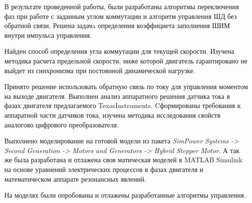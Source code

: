 \documentclass{article}
\begin{document}
В результате проведенной работы, были разработаны алгоритмы переключения фаз при
работе с заданным углом коммутации и алгоритм управления ШД без обратной связи.
Решена задачa определения коэффициета заполнения ШИМ внутри импульса
управления.

Найден способ определения угла коммутации для текущей скорости. Изучена методика
расчета предельной скорости, ниже которой двигатель гарантировано не выйдет из
синхронизма при постоянной динамической нагрузке.

Принято решение использовать обратную связь по току для управления моментом на
выходе двигателя. Выполнен анализ аппаратного решения датчика тока в фазах двигателя
предлагаемого TexasInstruments. Cформированы требования к аппаратной части датчиков
тока, изучена методика исследования свойств аналогово цифрового преобразователя.

Выполнено моделирование на готовой модели из пакета
\textit{SimPower Systems -> Second Generation -> Motors and Generators -> Hybrid Stepper Motor}.
А так же была разработана и отлажена своя матическая моделей в MATLAB Simulink на основе
уравнений электрических процессов в фазах двигателя и математическом аппарате резонансных явлений.

На моделях были опробованы и отлажены разработанные алгоритмы управления.


\end{document}

